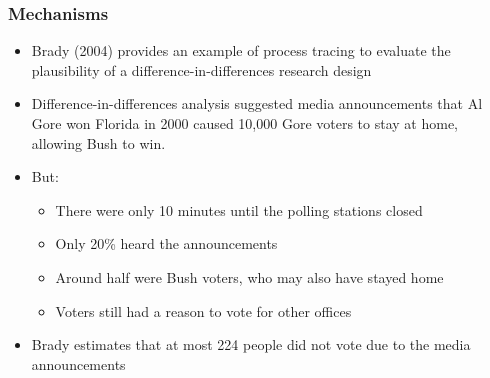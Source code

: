 \documentclass[xcolor=x11names,compress]{beamer}\usepackage[]{graphicx}\usepackage[]{color}
\renewcommand{\(}{\begin{columns}}
\renewcommand{\)}{\end{columns}}
\newcommand{\<}[1]{\begin{column}{#1}}
\renewcommand{\>}{\end{column}}
\begin{document}
\begin{frame}
\frametitle{Mechanisms}
\begin{itemize}
\item Brady (2004) provides an example of process tracing to evaluate the plausibility of a difference-in-differences research design
\item Difference-in-differences analysis suggested media announcements that Al Gore won Florida in 2000 caused 10,000 Gore voters to stay at home, allowing Bush to win.
\item But:
\begin{itemize}
\item There were only 10 minutes until the polling stations closed
\item Only 20\% heard the announcements
\item Around half were Bush voters, who may also have stayed home
\item Voters still had a reason to vote for other offices
\end{itemize}
\item Brady estimates that at most 224 people did not vote due to the media announcements
\end{itemize}
\end{frame}

 
\end{document}
